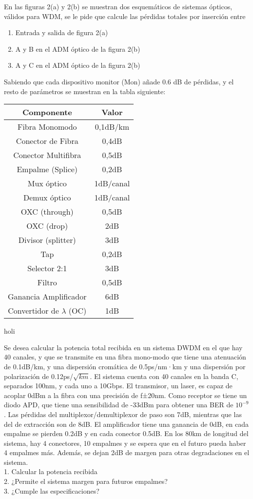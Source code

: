 \begin{exercise}[8]
	En las figuras 2(a) y 2(b) se muestran dos esquemáticos de sistemas ópticos, válidos para WDM, se le pide que calcule las pérdidas totales por inserción entre
\begin{enumerate}
	\item Entrada y salida de figura 2(a)
	\item A y B en el ADM óptico de la figura 2(b)
	\item A y C en el ADM óptico de la figura 2(b)
\end{enumerate}
Sabiendo que cada dispositivo monitor (Mon) añade 0.6 dB de pérdidas, y el resto de parámetros se muestran en la tabla siguiente:
\begin{center}
\begin{tabular}{c | c}
\hline
	\textbf{Componente} 	& \textbf{Valor}\\\hline
	Fibra Monomodo			& 0,1dB/km\\
	Conector de Fibra		& 0,4dB\\
	Conector Multifibra		& 0,5dB\\
	Empalme (Splice)		& 0,2dB\\
	Mux óptico				& 1dB/canal\\
	Demux óptico			& 1dB/canal\\
	OXC (through)			& 0,5dB\\
	OXC (drop)				& 2dB\\
	Divisor (splitter)		& 3dB\\
	Tap						& 0,2dB\\
	Selector 2:1			& 3dB\\
	Filtro					& 0,5dB\\
	Ganancia Amplificador	& 6dB\\
	Convertidor de $\lambda$ (OC)	& 1dB\\\hline
\end{tabular}
\end{center}
holi
\end{exercise}
\begin{exercise}[9]
	Se desea calcular la potencia total recibida en un sistema DWDM en el que hay 40 canales, y que se transmite en una fibra mono-modo que tiene una atenuación de 0.1dB/km, y una dispersión cromática de 0.5ps/nm·km y una dispersión por polarización de 0.12ps/$\sqrt{km}$. El sistema cuenta con 40 canales en la banda C, separados 100nm, y cada uno a 10Gbps. El transmisor, un laser, es capaz de acoplar 0dBm a la fibra con una precisión de f±20nm. Como receptor se tiene un diodo APD, que tiene una sensibilidad de -33dBm para obtener una BER de $10^{-9}$ . Las pérdidas del multiplexor/demultiplexor de paso son 7dB, mientras que las del de extracción son de 8dB. El amplificador tiene una ganancia de 0dB, en cada empalme se pierden 0.2dB y en cada conector 0.5dB. En los 80km de longitud del sistema, hay 4 conectores, 10 empalmes y se espera que en el futuro pueda haber 4 empalmes más. Además, se dejan 2dB de margen para otras degradaciones en el sistema.\\
1. Calcular la potencia recibida\\
2. ¿Permite el sistema margen para futuros empalmes?\\
3. ¿Cumple las especificaciones?
\end{exercise}
